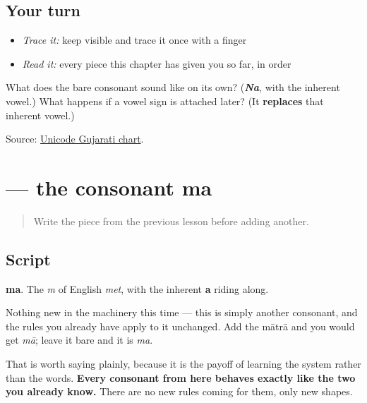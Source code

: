 \subsection*{Your turn}
\begin{itemize}
\raggedright
  \item \emph{Trace it:} keep  visible and trace it once with a finger
  \item \emph{Read it:} every piece this chapter has given you so far, in order
\end{itemize}

\begin{tcolorbox}[breakable,colback=teal!4,colframe=teal!35!black,title={Before you move on}]
What does the bare consonant sound like on its own? (\emph{\textbf{Na}}, with the inherent vowel.) What happens if a vowel sign is attached later? (It \textbf{replaces} that inherent vowel.)

Source: \href{https://www.unicode.org/charts/PDF/U0A80.pdf}{Unicode Gujarati chart}.
\end{tcolorbox}
\section[\texorpdfstring{\gu{મ} (ma)}{મ (ma)}]{ — the consonant ma}

\label{lesson:GU-W01-ma}



\begin{quote}
Write the piece from the previous lesson before adding another.
\end{quote}

\subsection*{Script}

\begin{quote}
\end{quote}

\textbf{ma}. The \emph{m} of English \emph{met}, with the inherent \textbf{a} riding along.

Nothing new in the machinery this time — this is simply another consonant, and the rules you already have apply to it unchanged. Add the mātrā and you would get \emph{mā}; leave it bare and it is \emph{ma}.

That is worth saying plainly, because it is the payoff of learning the system rather than the words. \textbf{Every consonant from here behaves exactly like the two you already know.} There are no new rules coming for them, only new shapes.

